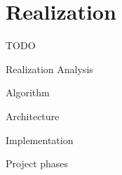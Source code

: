
%
%

\chapter{Realization}

TODO

Realization
	Analysis
	
	Algorithm

	Architecture

	Implementation
	
	Project phases
